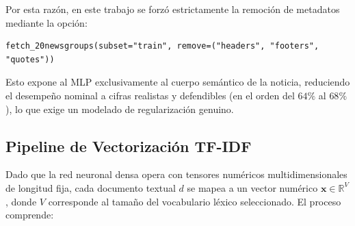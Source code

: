 \documentclass[12pt, a4paper]{article}
\begin{document}
Por esta razón, en este trabajo se forzó estrictamente la remoción de metadatos mediante la opción:
\begin{lstlisting}
fetch_20newsgroups(subset="train", remove=("headers", "footers", "quotes"))
\end{lstlisting}
Esto expone al MLP exclusivamente al cuerpo semántico de la noticia, reduciendo el desempeño nominal a cifras realistas y defendibles (en el orden del $64\%$ al $68\%$), lo que exige un modelado de regularización genuino.

\subsection{Pipeline de Vectorización TF-IDF}

Dado que la red neuronal densa opera con tensores numéricos multidimensionales de longitud fija, cada documento textual $d$ se mapea a un vector numérico $\mathbf{x} \in \mathbb{R}^{V}$, donde $V$ corresponde al tamaño del vocabulario léxico seleccionado. El proceso comprende:
\end{document}
